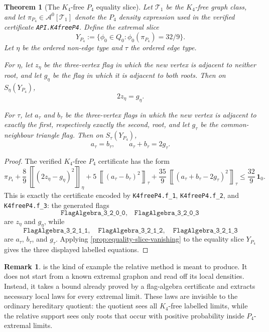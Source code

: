 \documentclass[11pt]{article}
\newtheorem{theorem}{Theorem}
\theoremstyle{definition}
\newtheorem{remark}[remark]{Remark}
\newcommand{\A}{\mathcal{A}}
\newcommand{\T}{\mathcal{T}}
\newcommand{\avg}[2]{\left\llbracket #1 \right\rrbracket_{#2}}
\newcommand{\one}{\mathbf 1}
\begin{document}
\begin{theorem}[The $K_4$-free $P_4$ equality slice]\label{thm:k4free-p4-equality-slice}
Let $\T_1$ be the $K_4$-free graph class, and let $\pi_{P_4}\in\A^0[\T_1]$ denote
the $P_4$ density expression used in the verified certificate
\texttt{API.K4freeP4}.  Define the extremal slice
\[
  Y_{P_4}:=\{\phi_0\in Q_0:\phi_0(\pi_{P_4})=32/9\}.
\]
Let $\eta$ be the ordered non-edge type and $\tau$ the ordered edge type.

For $\eta$, let $z_\eta$ be the three-vertex flag in which the new vertex is adjacent
to neither root, and let $g_\eta$ be the flag in which it is adjacent to both roots.
Then on $S_\eta(Y_{P_4})$,
\[
  2z_\eta=g_\eta .
\]

For $\tau$, let $a_\tau$ and $b_\tau$ be the three-vertex flags in which the new
vertex is adjacent to exactly the first, respectively exactly the second, root, and let
$g_\tau$ be the common-neighbour triangle flag.  Then on $S_\tau(Y_{P_4})$,
\[
  a_\tau=b_\tau,
  \qquad
  a_\tau+b_\tau=2g_\tau .
\]
\end{theorem}

\begin{proof}
The verified $K_4$-free $P_4$ certificate has the form
\[
  \pi_{P_4}
  +\frac89\,\avg{(2z_\eta-g_\eta)^2}{\eta}
  +5\,\avg{(a_\tau-b_\tau)^2}{\tau}
  +\frac{35}{9}\,\avg{(a_\tau+b_\tau-2g_\tau)^2}{\tau}
  \le \frac{32}{9}\,\one_0 .
\]
This is exactly the certificate encoded by
\texttt{K4freeP4.f\_1}, \texttt{K4freeP4.f\_2}, and \texttt{K4freeP4.f\_3}:
the generated flags
\[
  \texttt{FlagAlgebra\_3\_2\_0\_0},\quad
  \texttt{FlagAlgebra\_3\_2\_0\_3}
\]
are $z_\eta$ and $g_\eta$, while
\[
  \texttt{FlagAlgebra\_3\_2\_1\_1},\quad
  \texttt{FlagAlgebra\_3\_2\_1\_2},\quad
  \texttt{FlagAlgebra\_3\_2\_1\_3}
\]
are $a_\tau$, $b_\tau$, and $g_\tau$.  Applying
\cref{prop:equality-slice-vanishing} to the equality slice $Y_{P_4}$ gives the three
displayed labelled equations.
\end{proof}

\begin{remark}
 is the kind of example the relative method is meant
to produce.  It does not start from a known extremal graphon and read off its local
densities.  Instead, it takes a bound already proved by a flag-algebra certificate and
extracts necessary local laws for every extremal limit.  These laws are invisible to the
ordinary hereditary quotient: the quotient sees all $K_4$-free labelled limits, while the
relative support sees only roots that occur with positive probability inside
$P_4$-extremal limits.
\end{remark}
\end{document}
